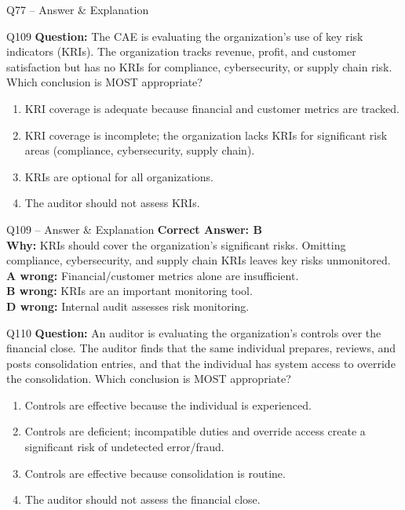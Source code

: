 \documentclass[aspectratio=169,10pt]{beamer}
\begin{document}
\begin{frame}[t]{Q77 -- Answer \& Explanation}
	\begin{frame}[t]{Q109}
		\small
		\textbf{Question:} The CAE is evaluating the organization's use of key risk indicators (KRIs). The organization tracks revenue, profit, and customer satisfaction but has no KRIs for compliance, cybersecurity, or supply chain risk. Which conclusion is MOST appropriate?
		\begin{enumerate}[label=\Alph*.,itemsep=1pt,topsep=2pt]
			\item KRI coverage is adequate because financial and customer metrics are tracked.
			\item KRI coverage is incomplete; the organization lacks KRIs for significant risk areas (compliance, cybersecurity, supply chain).
			\item KRIs are optional for all organizations.
			\item The auditor should not assess KRIs.
		\end{enumerate}
	\end{frame}
	
	\begin{frame}[t]{Q109 -- Answer \& Explanation}
		\small
		\textbf{Correct Answer: B} \\[4pt]
		\textbf{Why:} KRIs should cover the organization's significant risks. Omitting compliance, cybersecurity, and supply chain KRIs leaves key risks unmonitored. \\[4pt]
		\textbf{A wrong:} Financial/customer metrics alone are insufficient. \\[2pt]
		\textbf{B wrong:} KRIs are an important monitoring tool. \\[2pt]
		\textbf{D wrong:} Internal audit assesses risk monitoring.
	\end{frame}
	
	\begin{frame}[t]{Q110}
		\small
		\textbf{Question:} An auditor is evaluating the organization's controls over the financial close. The auditor finds that the same individual prepares, reviews, and posts consolidation entries, and that the individual has system access to override the consolidation. Which conclusion is MOST appropriate?
		\begin{enumerate}[label=\Alph*.,itemsep=1pt,topsep=2pt]
			\item Controls are effective because the individual is experienced.
			\item Controls are deficient; incompatible duties and override access create a significant risk of undetected error/fraud.
			\item Controls are effective because consolidation is routine.
			\item The auditor should not assess the financial close.
		\end{enumerate}
	\end{frame}
	

\end{frame}
\end{document}
